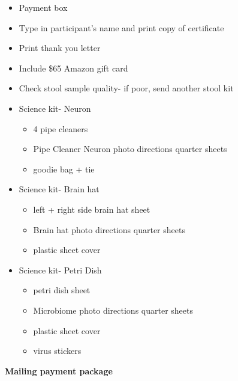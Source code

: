 \documentclass[]{book}
\providecommand{\tightlist}{%
  \setlength{\itemsep}{0pt}\setlength{\parskip}{0pt}}
\begin{document}
\begin{itemize}
\tightlist
\item
  Payment box
\item
  Type in participant's name and print copy of certificate
\item
  Print thank you letter
\item
  Include \$65 Amazon gift card
\item
  Check stool sample quality- if poor, send another stool kit
\item
  Science kit- Neuron

  \begin{itemize}
  \tightlist
  \item
    4 pipe cleaners
  \item
    Pipe Cleaner Neuron photo directions quarter sheets
  \item
    goodie bag + tie
  \end{itemize}
\item
  Science kit- Brain hat

  \begin{itemize}
  \tightlist
  \item
    left + right side brain hat sheet
  \item
    Brain hat photo directions quarter sheets
  \item
    plastic sheet cover
  \end{itemize}
\item
  Science kit- Petri Dish

  \begin{itemize}
  \tightlist
  \item
    petri dish sheet
  \item
    Microbiome photo directions quarter sheets
  \item
    plastic sheet cover
  \item
    virus stickers
  \end{itemize}
\end{itemize}

\textbf{Mailing payment package}
\end{document}
